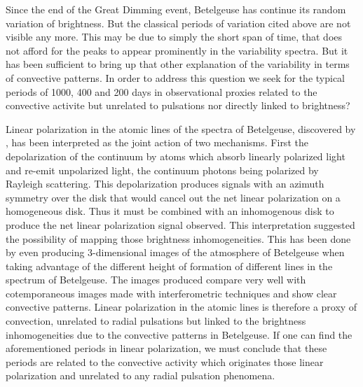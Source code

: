 \documentclass{aa}
\begin{document}
Since the end of the Great Dimming event, Betelgeuse has continue its random variation of brightness. But the classical periods 
of variation cited above are not visible any more. This may be due to simply the short span of time, that does not afford for 
the peaks to appear prominently in the variability spectra. But it has been sufficient to bring up that other explanation of the variability
in terms  of convective patterns. In order to address this question we seek for the typical periods of 1000, 400 and 200 days in  
observational proxies related to the convective activite but unrelated to pulsations nor directly linked to brightness?

Linear polarization in the atomic lines of the spectra of Betelgeuse, discovered by \cite{}, has been interpreted as the joint action of 
two mechanisms. First the depolarization of the continuum by atoms which absorb linearly polarized light and re-emit unpolarized light, the 
continuum photons being polarized by Rayleigh scattering. This depolarization produces signals with an azimuth symmetry over the disk that 
would  cancel out the net linear polarization on a homogeneous disk. Thus it must be combined with an inhomogenous disk to produce the net linear polarization 
signal observed. This interpretation suggested the possibility of mapping those brightness inhomogeneities. This has been done by \cite{} 
even producing 3-dimensional images of the atmosphere of Betelgeuse \cite{} when taking advantage of the different height of formation of 
different lines in the spectrum of Betelgeuse. The images produced compare very well with cotemporaneous images made with interferometric 
techniques and show clear convective patterns. Linear polarization in the atomic lines is therefore a proxy of convection, unrelated to radial 
pulsations but linked to the brightness inhomogeneities due to the convective patterns in Betelgeuse. If one can find the aforementioned periods 
in linear polarization, we must conclude that these periods are related to the convective activity which originates those linear polarization 
and unrelated to any radial pulsation phenomena.
\end{document}
